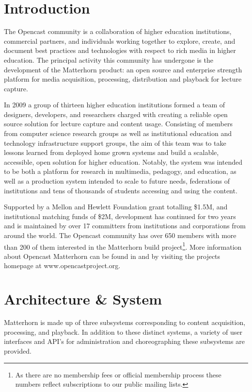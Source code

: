 \documentclass{sig-alternate}
\begin{document}

\section{Introduction}
The Opencast community is a collaboration of higher education institutions, commercial partners, and individuals working together to explore, create, and document best practices and technologies with respect to rich media in higher education.  The principal activity this community has undergone is the development of the Matterhorn product: an open source and enterprise strength platform for media acquisition, processing, distribution and playback for lecture capture.

In 2009 a group of thirteen higher education institutions formed a team of designers, developers, and researchers charged with creating a reliable open source solution for lecture capture and content usage.  Consisting of members from computer science research groups as well as institutional education and technology infrastructure support groups, the aim of this team was to take lessons learned from deployed home grown systems and build a scalable, accessible, open solution for higher education.  Notably, the system was intended to be both a platform for research in multimedia, pedagogy, and education, as well as a production system intended to scale to future needs, federations of institutions and tens of thousands of students accessing and using the content.

Supported by a Mellon and Hewlett Foundation grant totalling \$1.5M, and institutional matching funds of \$2M, development has continued for two years and is maintained by over 17 committers from institutions and corporations from around the world.  The Opencast community has over 650 members with more than 200 of them interested in the Matterhorn build project\footnote{As there are no membership fees or official membership process these numbers reflect subscriptions to our public mailing lists.}. More information about Opencast Matterhorn can be found in \cite{DBLP:journals/itse/KetterlSH10} and by visiting the projects homepage at www.opencastproject.org. 

\section{Architecture \& System}
Matterhorn is made up of three subsystems corresponding to content acquisition, processing, and playback.  In addition to these distinct systems, a variety of user interfaces and API's for administration and choreographing these subsystems are provided.  
\end{document}
